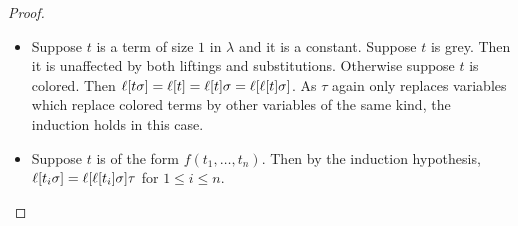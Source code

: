 \documentclass[,%
	paper=a4,%
	DIV15, 
	liststotoc,
	bibtotoc,
	draft=false,%
	numbers=noendperiod
]{scrartcl}
\begin{document}
\begin{proof}
\begin{itemize}
			\item Suppose $t$ is a term of size $1$ in $\lambda$ and  it is a constant.
				Suppose $t$ is grey. Then it is unaffected by both liftings and substitutions.
				Otherwise suppose $t$ is colored. Then $\ell[t\sigma] = \ell[t] = \ell[t]\sigma = \ell[\ell[t]\sigma]$.
				As $\tau$ again only replaces variables which replace colored terms by other variables of the same kind, the induction holds in this case. 


			\item Suppose $t$ is of the form $f(t_1, \dotsc, t_n)$.
				Then by the induction hypothesis, $\ell[t_i\sigma] = \ell[\ell[t_i]\sigma]\tau$ for $1 \leq i \leq n$.
	\end{itemize}


\end{proof}
\end{document}

